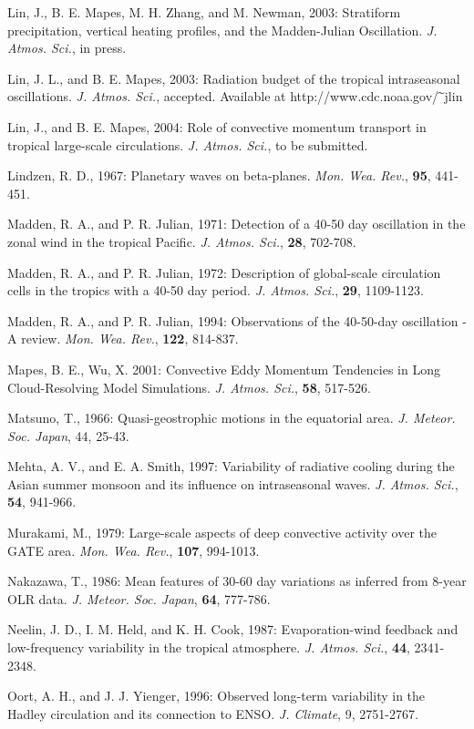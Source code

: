 \documentclass[12pt]{article}
\begin{document}
Lin, J., B. E. Mapes, M. H. Zhang, and M. Newman, 2003:
Stratiform precipitation, vertical heating profiles, 
and the Madden-Julian Oscillation. {\it J. Atmos. Sci.}, in press.

Lin, J. L., and B. E. Mapes, 2003: Radiation budget of the tropical
intraseasonal oscillations. {\it J. Atmos. Sci.}, accepted.
Available at http://www.cdc.noaa.gov/$\widetilde{\hspace*{0.05in}}$jlin

Lin, J., and B. E. Mapes, 2004:
Role of convective momentum transport in tropical large-scale circulations.
{\it J. Atmos. Sci.}, to be submitted.

Lindzen, R. D., 1967: Planetary waves on beta-planes. {\it Mon. Wea. Rev.},
{\bf 95}, 441-451.

Madden, R. A., and P. R. Julian, 1971: Detection of a 40-50 day oscillation in
the zonal wind in the tropical Pacific.
{\it J. Atmos. Sci.}, {\bf 28}, 702-708.

Madden, R. A., and P. R. Julian, 1972: Description of global-scale circulation
cells in the tropics with a 40-50 day period.
{\it J. Atmos. Sci.}, {\bf 29}, 1109-1123.

Madden, R. A., and P. R. Julian, 1994: Observations of the 40-50-day oscillation
-A review.
{\it Mon. Wea. Rev.}, {\bf 122}, 814-837.

Mapes, B. E., Wu, X. 2001: Convective Eddy Momentum Tendencies in Long
Cloud-Resolving Model Simulations. 
{\it J. Atmos. Sci.}, {\bf 58}, 517-526.

Matsuno, T., 1966: Quasi-geostrophic motions in the equatorial area.
{\it J. Meteor. Soc. Japan}, 44, 25-43.

Mehta, A. V., and E. A. Smith, 1997: Variability of radiative cooling during the
 Asian summer monsoon and its influence on intraseasonal waves.
{\it J. Atmos. Sci.}, {\bf 54}, 941-966.

Murakami, M., 1979: Large-scale aspects of deep convective activity over the
GATE area.
{\it Mon. Wea. Rev.}, {\bf 107}, 994-1013.

Nakazawa, T., 1986: Mean features of 30-60 day variations as inferred from 
8-year
OLR data. {\it J. Meteor. Soc. Japan}, {\bf 64}, 777-786.

Neelin, J. D., I. M. Held, and K. H. Cook, 1987: Evaporation-wind feedback and
low-frequency variability in the tropical atmosphere.
{\it J. Atmos. Sci.}, {\bf 44}, 2341-2348.

Oort, A. H., and J. J. Yienger, 1996: Observed long-term variability in the
Hadley circulation and its connection to ENSO. {\it J. Climate}, 9, 2751-2767.
\end{document}
